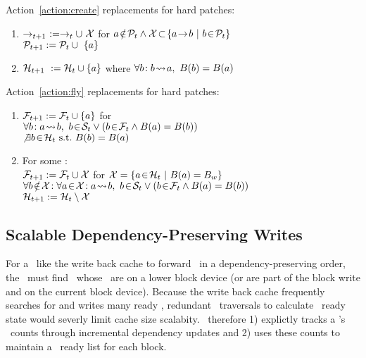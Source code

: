 \noindent Action~\ref{action:create} replacements for hard patches:
\begin{enumerate}
\item \(\deps{t+1}\ := \deps{t} \cup\ \pset{X}\) for
\(\notinset{a}{\psetall{t}} \land \pset{X}\! \subset\!
\{\depends{a}{b}\ |\ \inset{b}{\psetall{t}}\}\)\\
\(\psetall{t+1} := \psetall{t} \cup\ \{a\}\)

\item \(\mathcal{H}_{t+1}\ := \mathcal{H}_{t} \cup \{a\}\) where \(\forall b\!:
b\! \leadsto\! a,\ B(b) = B(a)\)
\end{enumerate}

\noindent Action~\ref{action:fly} replacements for hard patches:
\begin{enumerate}
\item \(\mathcal{F}_{t+1} := \mathcal{F}_{t} \cup \{a\}\) for
\\
\(\forall b\!: \indirdepends{a}{b},\ \inset{b}{\psetsat{t}} \lor (\inset{b}{\psetinflight{t}} \land \blockof{a} = \blockof{b})\)\\
\(\not\exists\inset{b}{\psethard{t}}\ \mbox{s.t.}\ \blockof{b} = \blockof{a}\)

\item For some :\\
\(\mathcal{F}_{t+1} := \mathcal{F}_{t} \cup \mathcal{X}\) for
\(\mathcal{X} = \{a\! \in\! \mathcal{H}_{t}\ |\ B(a) = B_{w}\}\)\\
\(\forall \notinset{b}{\pset{X}}\!: \forall \inset{a}{\pset{X}}\!:
\indirdepends{a}{b},\ \inset{b}{\psetsat{t}} \lor
(\inset{b}{\psetinflight{t}} \land \blockof{a} = \blockof{b})\)\\
\(\mathcal{H}_{t+1} := \mathcal{H}_{t} \setminus \mathcal{X}\)
\end{enumerate}

\subsection{Scalable Dependency-Preserving Writes}
For a \module\ like the write back cache to forward \chdescs\ in a
dependency-preserving order, the \module\ must find \chdescs\ whose
\befores\ are on a lower block device (or are part of the block write
and on the current block device). Because the write back cache
frequently searches for and writes many ready \chdescs, redundant
\before\ traversals to calculate \chdesc\ ready state would severly
limit cache size scalabity.
%
\Kudos\ therefore
%
1) explictly tracks a \chdesc's \before\ counts through incremental
dependency updates
%
and 2) uses these counts to maintain a \chdesc\ ready list for each
block.

